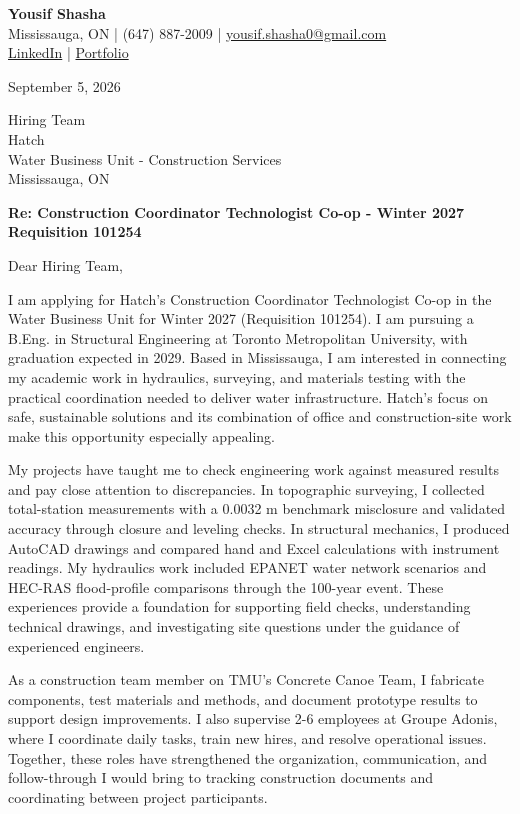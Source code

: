 \documentclass[11pt,letterpaper]{article}
\begin{document}
\begin{center}
{\LARGE\bfseries Yousif Shasha}\\[3pt]
Mississauga, ON | (647) 887-2009 | \href{mailto:yousif.shasha0@gmail.com}{yousif.shasha0@gmail.com}\\[2pt]
\href{https://www.linkedin.com/in/yousif-shasha-177412375}{LinkedIn} | \href{https://yousifshasha.github.io/Yousif-Shasha.github.io/}{Portfolio}
\end{center}
\setlength{\parskip}{10pt}
September 5, 2026

Hiring Team\\
Hatch\\
Water Business Unit - Construction Services\\
Mississauga, ON

\textbf{Re: Construction Coordinator Technologist Co-op - Winter 2027\\Requisition 101254}

Dear Hiring Team,

I am applying for Hatch's Construction Coordinator Technologist Co-op in the Water Business Unit for Winter 2027 (Requisition 101254). I am pursuing a B.Eng. in Structural Engineering at Toronto Metropolitan University, with graduation expected in 2029. Based in Mississauga, I am interested in connecting my academic work in hydraulics, surveying, and materials testing with the practical coordination needed to deliver water infrastructure. Hatch's focus on safe, sustainable solutions and its combination of office and construction-site work make this opportunity especially appealing.

My projects have taught me to check engineering work against measured results and pay close attention to discrepancies. In topographic surveying, I collected total-station measurements with a 0.0032 m benchmark misclosure and validated accuracy through closure and leveling checks. In structural mechanics, I produced AutoCAD drawings and compared hand and Excel calculations with instrument readings. My hydraulics work included EPANET water network scenarios and HEC-RAS flood-profile comparisons through the 100-year event. These experiences provide a foundation for supporting field checks, understanding technical drawings, and investigating site questions under the guidance of experienced engineers.

As a construction team member on TMU's Concrete Canoe Team, I fabricate components, test materials and methods, and document prototype results to support design improvements. I also supervise 2-6 employees at Groupe Adonis, where I coordinate daily tasks, train new hires, and resolve operational issues. Together, these roles have strengthened the organization, communication, and follow-through I would bring to tracking construction documents and coordinating between project participants.
\end{document}
